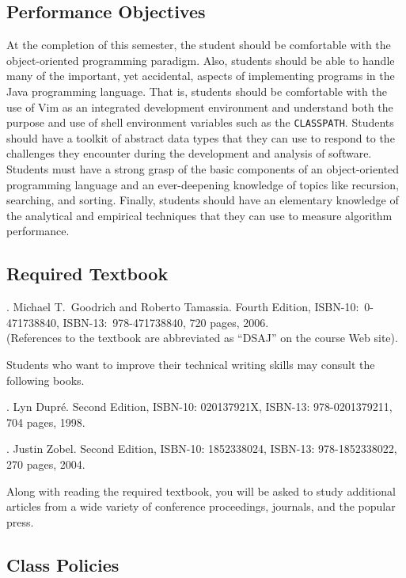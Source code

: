 \subsection*{Performance Objectives}

At the completion of this semester, the student should be comfortable with the object-oriented programming paradigm.
Also, students should be able to handle many of the important, yet accidental, aspects of implementing programs in the
Java programming language.  That is, students should be comfortable with the use of Vim as an integrated development
environment and understand both the purpose and use of shell environment variables such as the {\tt CLASSPATH}.
Students should have a toolkit of abstract data types that they can use to respond to the challenges they encounter
during the development and analysis of software.  Students must have a strong grasp of the basic components of an
object-oriented programming language and an ever-deepening knowledge of topics like recursion, searching, and sorting.
Finally, students should have an elementary knowledge of the analytical and empirical techniques that they can use to
measure algorithm performance.

\subsection*{Required Textbook}

. Michael T.\ Goodrich and Roberto Tamassia.
Fourth Edition, ISBN-10:\ 0-471738840, ISBN-13:\ 978-471738840, 720 pages, 2006. \\
(References to the textbook are abbreviated as ``DSAJ'' on the course Web site).

\noindent
Students who want to improve their technical writing skills may consult the following books.

. Lyn Dupr\'e. Second Edition,  ISBN-10: 020137921X,
ISBN-13: 978-0201379211, 704 pages, 1998.

.  Justin Zobel. Second Edition,  ISBN-10: 1852338024, ISBN-13:
978-1852338022, 270 pages, 2004.

\noindent
Along with reading the required textbook, you will be asked to study additional articles from a wide variety of
conference proceedings, journals, and the popular press.

\subsection*{Class Policies}


